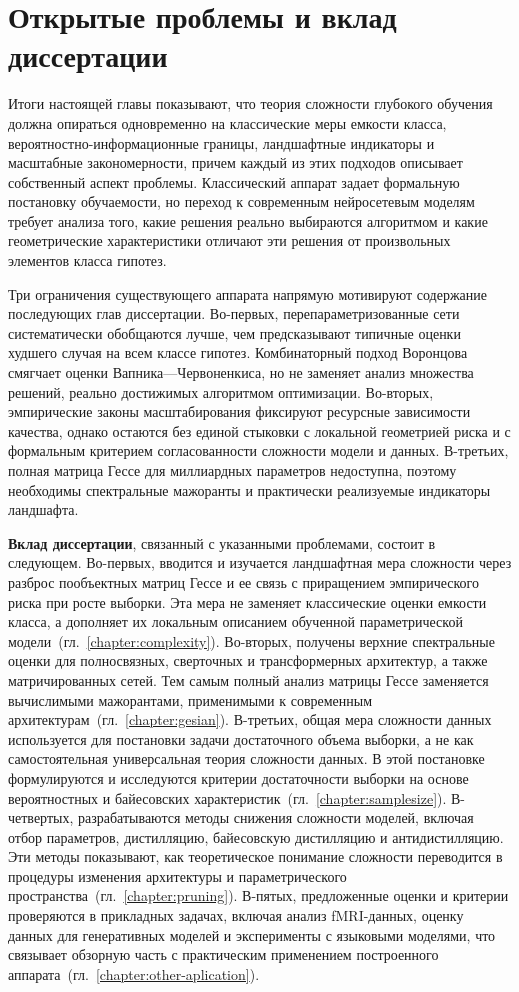 \section{Открытые проблемы и вклад диссертации}

Итоги настоящей главы показывают, что теория сложности глубокого обучения должна опираться одновременно на классические меры емкости класса, вероятностно-информационные границы, ландшафтные индикаторы и масштабные закономерности, причем каждый из этих подходов описывает собственный аспект проблемы.
Классический аппарат задает формальную постановку обучаемости, но переход к современным нейросетевым моделям требует анализа того, какие решения реально выбираются алгоритмом и какие геометрические характеристики отличают эти решения от произвольных элементов класса гипотез.

Три ограничения существующего аппарата напрямую мотивируют содержание последующих глав диссертации.
Во-первых, перепараметризованные сети систематически обобщаются лучше, чем предсказывают типичные оценки худшего случая на всем классе гипотез. Комбинаторный подход Воронцова смягчает оценки Вапника---Червоненкиса, но не заменяет анализ множества решений, реально достижимых алгоритмом оптимизации.
Во-вторых, эмпирические законы масштабирования фиксируют ресурсные зависимости качества, однако остаются без единой стыковки с локальной геометрией риска и с формальным критерием согласованности сложности модели и данных.
В-третьих, полная матрица Гессе для миллиардных параметров недоступна, поэтому необходимы спектральные мажоранты и практически реализуемые индикаторы ландшафта.

\textbf{Вклад диссертации}, связанный с указанными проблемами, состоит в следующем.
Во-первых, вводится и изучается ландшафтная мера сложности через разброс пообъектных матриц Гессе и ее связь с приращением эмпирического риска при росте выборки.
Эта мера не заменяет классические оценки емкости класса, а дополняет их локальным описанием обученной параметрической модели~(гл.~\ref{chapter:complexity}).
Во-вторых, получены верхние спектральные оценки для полносвязных, сверточных и трансформерных архитектур, а также матричированных сетей. Тем самым полный анализ матрицы Гессе заменяется вычислимыми мажорантами, применимыми к современным архитектурам~(гл.~\ref{chapter:gesian}).
В-третьих, общая мера сложности данных используется для постановки задачи достаточного объема выборки, а не как самостоятельная универсальная теория сложности данных. В этой постановке формулируются и исследуются критерии достаточности выборки на основе вероятностных и байесовских характеристик~(гл.~\ref{chapter:samplesize}).
В-четвертых, разрабатываются методы снижения сложности моделей, включая отбор параметров, дистилляцию, байесовскую дистилляцию и антидистилляцию. Эти методы показывают, как теоретическое понимание сложности переводится в процедуры изменения архитектуры и параметрического пространства~(гл.~\ref{chapter:pruning}).
В-пятых, предложенные оценки и критерии проверяются в прикладных задачах, включая анализ fMRI-данных, оценку данных для генеративных моделей и эксперименты с языковыми моделями, что связывает обзорную часть с практическим применением построенного аппарата~(гл.~\ref{chapter:other-aplication}).

